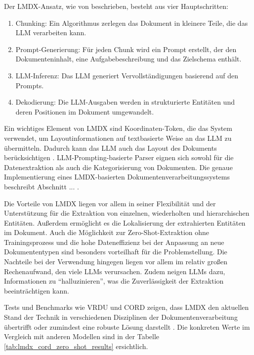 Der \gls{LMDX}-Ansatz, wie von \textcite{PerotVincent2024LLMD} beschrieben, besteht aus vier Hauptschritten:

\begin{enumerate}
	\item Chunking: Ein Algorithmus zerlegen das Dokument in kleinere Teile, die das \gls{LLM} verarbeiten kann.
	\item Prompt-Generierung: Für jeden Chunk wird ein Prompt erstellt, der den Dokumenteninhalt, eine Aufgabebeschreibung und das Zielschema enthält.
	\item \gls{LLM}-Inferenz: Das \gls{LLM} generiert Vervollständigungen basierend auf den Prompts.
	\item Dekodierung: Die \gls{LLM}-Ausgaben werden in strukturierte Entitäten und deren Positionen im Dokument umgewandelt.
\end{enumerate}

Ein wichtiges Element von \gls{LMDX} sind Koordinaten-Token, die das System verwendet, um Layoutinformationen auf textbasierte Weise an das \gls{LLM} zu übermitteln. Dadurch kann das \gls{LLM} auch das Layout des Dokuments berücksichtigen \parencite{PerotVincent2024LLMD}. LLM-Prompting-basierte Parser eignen sich sowohl für die Datenextraktion als auch die Kategorisierung von Dokumenten. Die genaue Implementierung eines \gls{LMDX}-basierten Dokumentenverarbeitungssystems beschreibt Abschnitt ... .

Die Vorteile von \gls{LMDX} liegen vor allem in seiner Flexibilität und der Unterstützung für die Extraktion von einzelnen, wiederholten und hierarchischen Entitäten. Außerdem ermöglicht es die Lokalisierung der extrahierten Entitäten im Dokument. Auch die Möglichkeit zur Zero-Shot-Extraktion ohne Trainingsprozess und die hohe Dateneffizienz bei der Anpassung an neue Dokumententypen sind besonders vorteilhaft für die Problemstellung. Die Nachteile bei der Verwendung hingegen liegen vor allem im relativ großen Rechenaufwand, den viele \glspl{LLM} verursachen. Zudem neigen \glspl{LLM} dazu, Informationen zu ``halluzinieren'', was die Zuverlässigkeit der Extraktion beeinträchtigen kann.

Tests und Benchmarks wie VRDU \parencite{WangZilong2023VABf} und CORD \parencite{park2019cord} zeigen, dass \gls{LMDX} den aktuellen Stand der Technik in verschiedenen Disziplinen der Dokumentenverarbeitung übertrifft oder zumindest eine robuste Lösung darstellt \parencite{PerotVincent2024LLMD}. Die konkreten Werte im Vergleich mit anderen Modellen sind in der Tabelle \ref{tab:lmdx_cord_zero_shot_results} ersichtlich.

